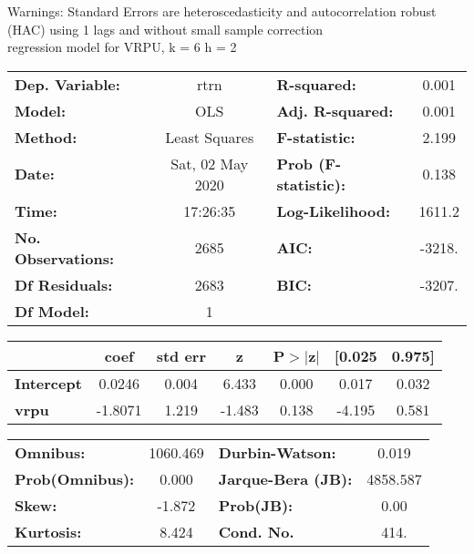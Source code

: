 Warnings: \newline
 [1] Standard Errors are heteroscedasticity and autocorrelation robust (HAC) using 1 lags and without small sample correction\\ 

regression model for VRPU, k = 6 h = 2\begin{center}
\begin{tabular}{lclc}
\toprule
\textbf{Dep. Variable:}    &       rtrn       & \textbf{  R-squared:         } &     0.001   \\
\textbf{Model:}            &       OLS        & \textbf{  Adj. R-squared:    } &     0.001   \\
\textbf{Method:}           &  Least Squares   & \textbf{  F-statistic:       } &     2.199   \\
\textbf{Date:}             & Sat, 02 May 2020 & \textbf{  Prob (F-statistic):} &    0.138    \\
\textbf{Time:}             &     17:26:35     & \textbf{  Log-Likelihood:    } &    1611.2   \\
\textbf{No. Observations:} &        2685      & \textbf{  AIC:               } &    -3218.   \\
\textbf{Df Residuals:}     &        2683      & \textbf{  BIC:               } &    -3207.   \\
\textbf{Df Model:}         &           1      & \textbf{                     } &             \\
\bottomrule
\end{tabular}
\begin{tabular}{lcccccc}
                   & \textbf{coef} & \textbf{std err} & \textbf{z} & \textbf{P$> |$z$|$} & \textbf{[0.025} & \textbf{0.975]}  \\
\midrule
\textbf{Intercept} &       0.0246  &        0.004     &     6.433  &         0.000        &        0.017    &        0.032     \\
\textbf{vrpu}      &      -1.8071  &        1.219     &    -1.483  &         0.138        &       -4.195    &        0.581     \\
\bottomrule
\end{tabular}
\begin{tabular}{lclc}
\textbf{Omnibus:}       & 1060.469 & \textbf{  Durbin-Watson:     } &    0.019  \\
\textbf{Prob(Omnibus):} &   0.000  & \textbf{  Jarque-Bera (JB):  } & 4858.587  \\
\textbf{Skew:}          &  -1.872  & \textbf{  Prob(JB):          } &     0.00  \\
\textbf{Kurtosis:}      &   8.424  & \textbf{  Cond. No.          } &     414.  \\
\bottomrule
\end{tabular}
\end{center}

